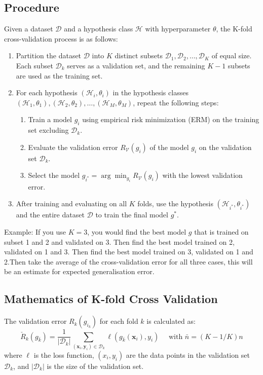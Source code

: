 \subsection*{Procedure}
Given a dataset $\mathcal{D}$ and a hypothesis class $\mathcal{H}$ with hyperparameter $\theta$, the K-fold cross-validation process is as follows:

\begin{enumerate}
    \item Partition the dataset $\mathcal{D}$ into $K$ distinct subsets $\mathcal{D}_1, \mathcal{D}_2, \ldots, \mathcal{D}_K$ of equal size. Each subset $\mathcal{D}_k$ serves as a validation set, and the remaining $K-1$ subsets are used as the training set.
    
    \item For each hypothesis $(\mathcal{H}_i, \theta_i)$ in the hypothesis classes $(\mathcal{H}_1,\theta_1),(\mathcal{H}_2,\theta_2),\ldots,(\mathcal{H}_M,\theta_M)$, repeat the following steps:
    \begin{enumerate}
        \item Train a model $g_i$ using empirical risk minimization (ERM) on the training set excluding $\mathcal{D}_k$.
        \item Evaluate the validation error $R_{\mathcal{V}}(g_i)$ of the model $g_i$ on the validation set $\mathcal{D}_k$.
        \item Select the model $g_{i^*} = \arg\min_{g_i} R_{\mathcal{V}}(g_i)$ with the lowest validation error.
    \end{enumerate}
    
    \item After training and evaluating on all $K$ folds, use the hypothesis $(\mathcal{H}_{i^*}, \theta_{i^*})$ and the entire dataset $\mathcal{D}$ to train the final model $g^*$.
\end{enumerate}

Example: If you use $K=3$, you would find the best model $g$ that is trained on subset 1 and 2 and validated on 3. Then find the best model trained on 2, validated on 1 and 3. Then find the best model trained on 3, validated on 1 and 2.Then take the average of the cross-validation error for all three cases, this will be an estimate for expected generalisation error.

\subsection*{Mathematics of K-fold Cross Validation}
The validation error $R_k(g_{i_k})$ for each fold $k$ is calculated as:
\begin{equation}
\check{R}_k(g_{\bar{k}})=\frac{1}{|\mathcal{D}_k|}\sum_{(\mathbf{x}_i,\mathbf{y}_i)\in\mathcal{D}_k}\ell(g_{\bar{k}}(\mathbf{x}_i),y_i)\quad \text{ with }\bar{n}=(K-1/K)n
\end{equation}
where $\ell$ is the loss function, $(x_i, y_i)$ are the data points in the validation set $\mathcal{D}_k$, and $|\mathcal{D}_k|$ is the size of the validation set.

